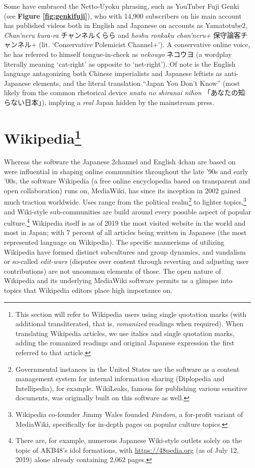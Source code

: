 \documentclass[10pt,british,A4paper,oneside]{memoir}
\begin{document}
Some have embraced the Netto-Uyoku phrasing, such as YouTuber Fuji Genki
(see \textbf{Figure \ref{fig:genkifuji}}), who with 14,900 subscribers
on his main account has published videos both in English and Japanese on
accounts as Yamatotube2, \emph{Chan'neru kura-ra} チャンネルくらら and
\emph{hoshu ronkaku chan'neru+} 保守論客チャンネル+ (lit. `Conservative
Polemicist Channel+'). A conservative online voice, he has referred to
himself tongue-in-cheek as \emph{nekouyo} ネコウヨ (a wordplay literally
meaning `cat-right' as opposite to `net-right'). Of note is the English
language antagonizing both Chinese imperialists and Japanese leftists as
anti-Japanese elements, and the literal translation ``Japan You Don't
Know'' (most likely from the common rhetorical device \emph{anata no
shiranai nihon} 「あなたの知らない日本」), implying a \emph{real} Japan
hidden by the mainstream press.

\section[Wikipedia]{\texorpdfstring{Wikipedia\footnote{This section will
  refer to Wikipedia users using single quotation marks (with additional
  transliterated, that is, \emph{romanized} readings when required).
  When translating Wikipedia articles, we use italics and single
  quotation marks, adding the romanized readings and original Japanese
  expression the first referred to that article.}}{Wikipedia}}\label{wikipedia76}

Whereas the software the Japanese 2channel and English 4chan are based
on were influential in shaping online communities throughout the late
'90s and early '00s, the software Wikipedia (a free online encyclopedia
based on transparent and open collaboration) runs on, MediaWiki, has
since its inception in 2002 gained much traction worldwide. Uses range
from the political realm\footnote{Governmental instances in the United
  States use the software as a content management system for internal
  information sharing (Diplopedia and Intellipedia), for example.
  WikiLeaks, famous for publishing various sensitive documents, was
  originally built on this software as well.} to lighter
topics,\footnote{Wikipedia co-founder Jimmy Wales founded \emph{Fandom},
  a for-profit variant of MediaWiki, specifically for in-depth pages on
  popular culture topics.} and Wiki-style sub-communities are build
around every possible aspect of popular culture.\footnote{There are, for
  example, numerous Japanese Wiki-style outlets solely on the topic of
  AKB48's idol formations, with \url{https://48pedia.org} (as of July 12, 2019) alone already containing 2,062 pages.} Wikipedia itself is
as of 2019 the  most visited website in the world and 
most in Japan; with 7 percent of all articles being written in Japanese
(the  most represented language on Wikipedia). The specific
mannerisms of utilizing Wikipedia have formed distinct subcultures and
group dynamics, and vandalism or so-called \emph{edit-wars} (disputes
over content through reverting and adjusting user contributions) are not
uncommon elements of those. The open nature of Wikipedia and its
underlying MediaWiki software permits us a glimpse into topics that
Wikipedia editors place high importance on.
\end{document}
